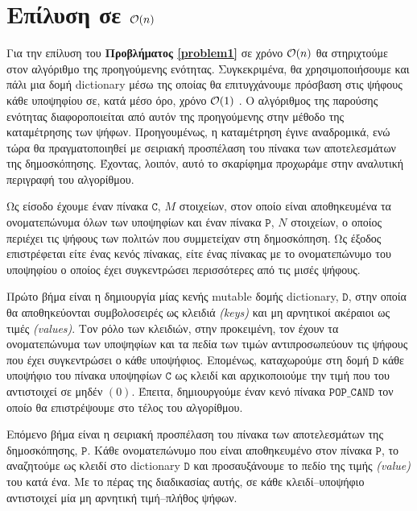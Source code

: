\section{Επίλυση σε $\mathcal{O}(n)$}

Για την επίλυση του \textbf{Προβλήματος \ref{problem1}} σε χρόνο $\mathcal{O}(n)$ θα στηριχτούμε στον αλγόριθμο της προηγούμενης ενότητας. Συγκεκριμένα, θα χρησιμοποιήσουμε και πάλι μια δομή dictionary μέσω της οποίας θα επιτυγχάνουμε πρόσβαση στις ψήφους κάθε υποψηφίου σε, κατά μέσο όρο, χρόνο $\mathcal{O}(1)$ . Ο αλγόριθμος της παρούσης ενότητας διαφοροποιείται από αυτόν της προηγούμενης στην μέθοδο της καταμέτρησης των ψήφων. Προηγουμένως, η καταμέτρηση έγινε αναδρομικά, ενώ τώρα θα πραγματοποιηθεί με σειριακή προσπέλαση του πίνακα των αποτελεσμάτων της δημοσκόπησης. Έχοντας, λοιπόν, αυτό το σκαρίφημα προχωράμε στην αναλυτική περιγραφή του αλγορίθμου.\par
\vspace*{18pt}
\begin{wrapfigure}{R}{0.6\textwidth}
	\begin{minipage}{0.6\textwidth}
	\vspace*{-12pt}
		
	\end{minipage}
\end{wrapfigure}
	Ως είσοδο έχουμε έναν πίνακα $\mathtt{C}$, $M$ στοιχείων, στον οποίο είναι αποθηκευμένα τα ονοματεπώνυμα όλων των υποψηφίων και έναν πίνακα $\mathtt{P}$, $N$ στοιχείων, ο οποίος περιέχει τις ψήφους των πολιτών που συμμετείχαν στη δημοσκόπηση. Ως έξοδος επιστρέφεται είτε ένας κενός πίνακας, είτε ένας πίνακας με το ονοματεπώνυμο του υποψηφίου ο οποίος έχει συγκεντρώσει περισσότερες από τις μισές ψήφους.\par
	Πρώτο βήμα είναι η δημιουργία μίας κενής mutable δομής dictionary, $\mathtt{D}$, στην οποία θα αποθηκεύονται συμβολοσειρές ως κλειδιά \textsl{(keys)} και μη αρνητικοί ακέραιοι ως τιμές \textsl{(values)}. Τον ρόλο των κλειδιών, στην προκειμένη, τον έχουν τα ονοματεπώνυμα των υποψηφίων και τα πεδία των τιμών αντιπροσωπεύουν τις ψήφους που έχει συγκεντρώσει ο κάθε υποψήφιος. Επομένως, καταχωρούμε στη δομή $\mathtt{D}$ κάθε υποψήφιο του πίνακα υποψηφίων $\mathtt{C}$ ως κλειδί και αρχικοποιούμε την τιμή που του αντιστοιχεί σε μηδέν $(0)$. Έπειτα, δημιουργούμε έναν κενό πίνακα $\mathtt{POP\_CAND}$ τον οποίο θα επιστρέψουμε στο τέλος του αλγορίθμου.\par%
	Επόμενο βήμα είναι η σειριακή προσπέλαση του πίνακα των αποτελεσμάτων της δημοσκόπησης, $\mathtt{P}$. Κάθε ονοματεπώνυμο που είναι αποθηκευμένο στον πίνακα $\mathtt{P}$, το αναζητούμε ως κλειδί στο dictionary $\mathtt{D}$ και προσαυξάνουμε το πεδίο της τιμής \textsl{(value)} του κατά ένα. Με το πέρας της διαδικασίας αυτής, σε κάθε κλειδί--υποψήφιο αντιστοιχεί μία μη αρνητική τιμή--πλήθος ψήφων.\par
